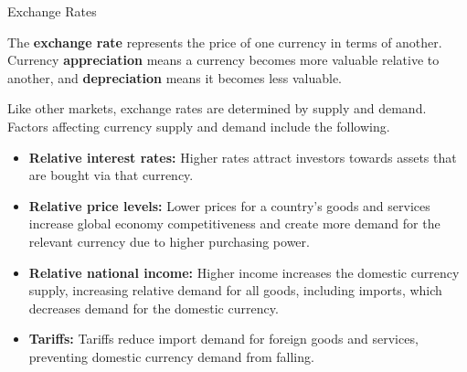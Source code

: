 \documentclass[10pt]{article}
\begin{document}
    \begin{core}{Exchange Rates}

      The \textbf{exchange rate} represents the price of one currency in terms of another. Currency \textbf{appreciation} means a currency becomes more valuable relative to another, and \textbf{depreciation} means it becomes less valuable.


      Like other markets, exchange rates are determined by supply and demand. Factors affecting currency supply and demand include the following.

      \begin{itemize}

        \item \textbf{Relative interest rates:} Higher rates attract investors towards assets that are bought via that currency.

        \item \textbf{Relative price levels:} Lower prices for a country's goods and services increase global economy competitiveness and create more demand for the relevant currency due to higher purchasing power.

        \item \textbf{Relative national income:} Higher income increases the domestic currency supply, increasing relative demand for all goods, including imports, which decreases demand for the domestic currency.

        \item \textbf{Tariffs:} Tariffs reduce import demand for foreign goods and services, preventing domestic currency demand from falling.

      \end{itemize}

    \end{core}
\end{document}
